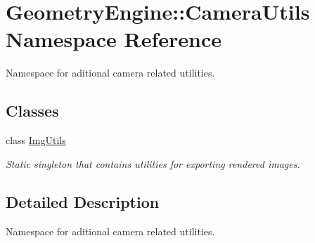 \hypertarget{namespace_geometry_engine_1_1_camera_utils}{}\section{Geometry\+Engine\+::Camera\+Utils Namespace Reference}
\label{namespace_geometry_engine_1_1_camera_utils}


Namespace for aditional camera related utilities.  


\subsection*{Classes}
\begin{DoxyCompactItemize}
\item 
class \mbox{\hyperlink{class_geometry_engine_1_1_camera_utils_1_1_img_utils}{Img\+Utils}}
\begin{DoxyCompactList}\small\item\em Static singleton that contains utilities for exporting rendered images. \end{DoxyCompactList}\end{DoxyCompactItemize}


\subsection{Detailed Description}
Namespace for aditional camera related utilities. 